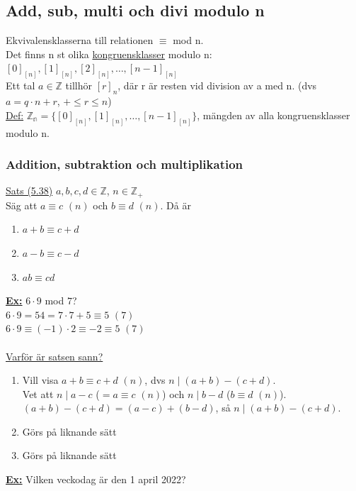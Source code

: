\documentclass{article}
\begin{document}
    \subsection{Add, sub, multi och divi modulo n}
    Ekvivalensklasserna till relationen $\equiv$ mod n.\\
    Det finns n st olika \underline{kongruensklasser} modulo n:\\
    \indent $[0]_[n], [1]_[n], [2]_[n], \ldots, [n-1]_[n]$\\
    Ett tal $a\in \mathbb{Z}$ tillhör $[r]_{n}$, där r är resten vid division av a med n. (dvs $a=q\cdot n+r$, $+\leq r\leq n$)\\
    \underline{Def:} $\mathbb{Z_{n}}=\{[0]_[n], [1]_[n], \ldots, [n-1]_[n]\}$, mängden av alla kongruensklasser modulo n.
    \subsubsection{Addition, subtraktion och multiplikation}
    \underline{Sats (5.38)} $a,b,c,d\in \mathbb{Z}$, $n\in \mathbb{Z_{+}}$\\
    \indent Säg att $a\equiv c$ $(n)$ och $b\equiv d$ $(n)$. Då är 
    \begin{enumerate}
        \item $a+b\equiv c+d$
        \item $a-b\equiv c-d$
        \item $ab\equiv cd$
    \end{enumerate}
    \underline{\textbf{Ex:}} $6\cdot 9$ mod $7$?\\
    \indent $6\cdot 9=54=7\cdot 7+5\equiv 5$ $(7)$\\
    \indent $6\cdot 9\equiv (-1)\cdot 2\equiv -2\equiv 5$ $(7)$\\\\
    \underline{Varför är satsen sann?}\\
    \begin{enumerate}
        \item Vill visa $a+b\equiv c+d$ $(n)$, dvs $n\mid (a+b)-(c+d)$.\\
                Vet att $n\mid a-c$ ($=a\equiv c$ $(n)$) och $n\mid b-d$ ($b\equiv d$ $(n)$).\\
                $(a+b)-(c+d)=(a-c)+(b-d)$, så $n\mid (a+b)-(c+d)$.
        \item Görs på liknande sätt
        \item Görs på liknande sätt
    \end{enumerate}
    \underline{\textbf{Ex:}} Vilken veckodag är den 1 april 2022?\\
\end{document}

